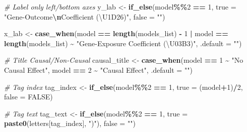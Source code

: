\documentclass[
]{article}
\newenvironment{Shaded}{\begin{snugshade}}{\end{snugshade}}
\newcommand{\AttributeTok}[1]{\textcolor[rgb]{0.13,0.29,0.53}{#1}}
\newcommand{\CommentTok}[1]{\textcolor[rgb]{0.56,0.35,0.01}{\textit{#1}}}
\newcommand{\ConstantTok}[1]{\textcolor[rgb]{0.56,0.35,0.01}{#1}}
\newcommand{\DecValTok}[1]{\textcolor[rgb]{0.00,0.00,0.81}{#1}}
\newcommand{\FunctionTok}[1]{\textcolor[rgb]{0.13,0.29,0.53}{\textbf{#1}}}
\newcommand{\NormalTok}[1]{#1}
\newcommand{\OtherTok}[1]{\textcolor[rgb]{0.56,0.35,0.01}{#1}}
\newcommand{\SpecialCharTok}[1]{\textcolor[rgb]{0.81,0.36,0.00}{\textbf{#1}}}
\newcommand{\StringTok}[1]{\textcolor[rgb]{0.31,0.60,0.02}{#1}}
\begin{document}
\begin{Shaded}
\begin{Highlighting}[]
  \CommentTok{\# Label only left/bottom axes}
\NormalTok{  y\_lab }\OtherTok{\textless{}{-}} \FunctionTok{if\_else}\NormalTok{(model}\SpecialCharTok{\%\%}\DecValTok{2} \SpecialCharTok{==} \DecValTok{1}\NormalTok{,}
                   \AttributeTok{true =} \StringTok{"Gene{-}Outcome}\SpecialCharTok{\textbackslash{}n}\StringTok{Coefficient (\textbackslash{}U1D26)"}\NormalTok{,}
                   \AttributeTok{false =} \StringTok{""}\NormalTok{) }
  
\NormalTok{  x\_lab }\OtherTok{\textless{}{-}} \FunctionTok{case\_when}\NormalTok{(model }\SpecialCharTok{==} \FunctionTok{length}\NormalTok{(models\_list) }\SpecialCharTok{{-}} \DecValTok{1} \SpecialCharTok{|}\NormalTok{ model }\SpecialCharTok{==} \FunctionTok{length}\NormalTok{(models\_list) }\SpecialCharTok{\textasciitilde{}} \StringTok{"Gene{-}Exposure Coefficient (\textbackslash{}U03B3)"}\NormalTok{,}
                     \AttributeTok{.default =} \StringTok{""}\NormalTok{) }
  
  \CommentTok{\# Title Causal/Non{-}Causal}
\NormalTok{  causal\_title }\OtherTok{\textless{}{-}} \FunctionTok{case\_when}\NormalTok{(model }\SpecialCharTok{==}  \DecValTok{1} \SpecialCharTok{\textasciitilde{}} \StringTok{"No Causal Effect"}\NormalTok{,}
\NormalTok{                            model }\SpecialCharTok{==} \DecValTok{2} \SpecialCharTok{\textasciitilde{}} \StringTok{"Causal Effect"}\NormalTok{,}
                            \AttributeTok{.default =} \StringTok{""}\NormalTok{) }
  
  \CommentTok{\# Tag index}
\NormalTok{  tag\_index }\OtherTok{\textless{}{-}} \FunctionTok{if\_else}\NormalTok{(model}\SpecialCharTok{\%\%}\DecValTok{2} \SpecialCharTok{==} \DecValTok{1}\NormalTok{,}
                       \AttributeTok{true =}\NormalTok{ (model}\SpecialCharTok{+}\DecValTok{1}\NormalTok{)}\SpecialCharTok{/}\DecValTok{2}\NormalTok{,}
                       \AttributeTok{false =} \ConstantTok{FALSE}\NormalTok{) }
  
  \CommentTok{\# Tag text}
\NormalTok{  tag\_text }\OtherTok{\textless{}{-}} \FunctionTok{if\_else}\NormalTok{(model}\SpecialCharTok{\%\%}\DecValTok{2} \SpecialCharTok{==} \DecValTok{1}\NormalTok{,}
                       \AttributeTok{true =} \FunctionTok{paste0}\NormalTok{(letters[tag\_index], }\StringTok{")"}\NormalTok{),}
                       \AttributeTok{false =} \StringTok{""}\NormalTok{) }
  

\end{Highlighting}
\end{Shaded}
\end{document}
